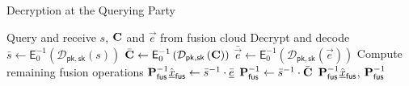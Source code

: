     \begin{algorithm}[htbp]
    \caption{Decryption at the Querying Party}\label{alg:cloud_fusion:secfci_query_steps}
    \begin{algorithmic}[1]
        \State Query and receive $s$, ${{\mathbf{C}}}$ and $\vec{e}$ from fusion cloud
        \LineComment Decrypt and decode
        \State $\bar{s} \gets \mathsf{E}^{-1}_{0}\left(\mathcal{D}_{\mathsf{pk},\mathsf{sk}}\left(s\right)\right)$
        \State $\bar{{{\mathbf{C}}}} \gets \mathsf{E}^{-1}_{0}\left(\mathcal{D}_{\mathsf{pk},\mathsf{sk}}\left({{\mathbf{C}}}\right)\right)$
        \State $\bar{\vec{e}} \gets \mathsf{E}^{-1}_{0}\left(\mathcal{D}_{\mathsf{pk},\mathsf{sk}}\left(\vec{e}\right)\right)$
        \LineComment Compute remaining fusion operations
        \State ${{\mathbf{P}}}_{\mathsf{fus}}^{-1}\hat{{\underline{x}}}_{\mathsf{fus}} \gets \bar{s}^{-1} \cdot \bar{{\underline{e}}}$
        \State ${{\mathbf{P}}}_{\mathsf{fus}}^{-1} \gets \bar{s}^{-1} \cdot \bar{{{\mathbf{C}}}}$
        \State \Return ${{\mathbf{P}}}_{\mathsf{fus}}^{-1}\hat{{\underline{x}}}_{\mathsf{fus}}$, ${{\mathbf{P}}}_{\mathsf{fus}}^{-1}$
        \EndProcedure
    \end{algorithmic}
\end{algorithm}

